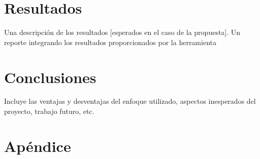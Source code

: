 \documentclass[a4paper]{article}
\begin{document}
\section{Resultados}
Una descripción de los resultados [esperados en el caso de la propuesta]. Un reporte integrando los resultados proporcionados por la herramienta
\section{Conclusiones}
Incluye las ventajas y desventajas del enfoque utilizado, aspectos inesperados del proyecto, trabajo futuro, etc.
\section{Apéndice}
\end{document}
